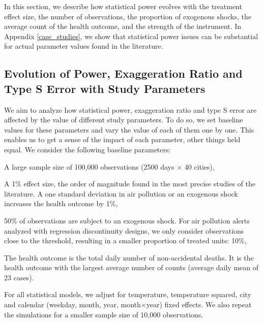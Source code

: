 \documentclass[12pt]{article}
\newenvironment{sitemize}{\itemize\addtolength{\itemsep}{-10pt}}{\enditemize} %
\begin{document}
        In this section, we describe how statistical power evolves with the treatment effect size, the number of observations, the proportion of exogenous shocks, the average count of the health outcome, and the strength of the instrument. In Appendix \ref{case_studies}, we show that statistical power issues can be substantial for actual parameter values found in the literature. 

        \subsection{Evolution of Power, Exaggeration Ratio and Type S Error with Study Parameters}

        We aim to analyze how statistical power, exaggeration ratio and type S error are affected by the value of different study parameters. To do so, we set baseline values for these parameters and vary the value of each of them one by one. This enables us to get a sense of the impact of each parameter, other things held equal. We consider the following baseline parameters:

            \begin{sloppypar}
            \begin{sitemize}
                \item A large sample size of 100,000 observations (2500 days × 40 cities),
                \item A 1\% effect size, the order of magnitude found in the most precise studies of the literature. A one standard deviation in air pollution or an exogenous shock increases the health outcome by 1\%,
                \item 50\% of observations are subject to an exogenous shock. For air pollution alerts analyzed with regression discontinuity designs, we only consider observations close to the threshold, resulting in a smaller proportion of treated units: 10\%,
                \item The health outcome is the total daily number of non-accidental deaths. It is the health outcome with the largest average number of counts (average daily mean of 23 cases).
            \end{sitemize}
            \end{sloppypar}
            
        \noindent For all statistical models, we adjust for temperature, temperature squared, city and calendar (weekday, month, year, month$\times$year) fixed effects. We also repeat the simulations for a smaller sample size of 10,000 observations.
        
\end{document}
